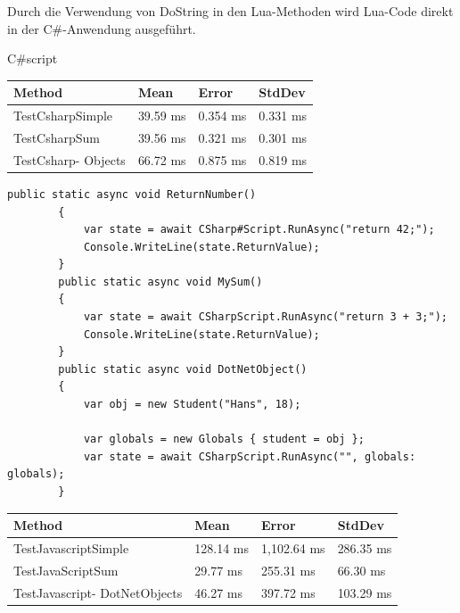 Durch die Verwendung von DoString in den Lua-Methoden wird Lua-Code direkt in der C\#-Anwendung ausgeführt.

\newpage
C\#script
        \begin{table}[H]
            \begin{tabular}{|p{3.5cm}|p{3cm}|p{3cm}|p{3cm}|}
            \hline
                Method & Mean & Error & StdDev \\ \hline
                TestCsharpSimple & 39.59 ms & 0.354 ms & 0.331 ms \\ \hline
                TestCsharpSum & 39.56 ms & 0.321 ms & 0.301 ms \\ \hline
                TestCsharp-
                Objects & 66.72 ms & 0.875 ms & 0.819 ms \\ \hline
            \end{tabular}
        \end{table}

        \begin{lstlisting}[language={[Sharp]C}, caption=\#ScriptingTestMethods, label=lst:imp:cscm]
            public static async void ReturnNumber()
        {
            var state = await CSharp#Script.RunAsync("return 42;");
            Console.WriteLine(state.ReturnValue);
        }
        public static async void MySum()
        {
            var state = await CSharpScript.RunAsync("return 3 + 3;");
            Console.WriteLine(state.ReturnValue);
        }
        public static async void DotNetObject()
        {
            var obj = new Student("Hans", 18);

            var globals = new Globals { student = obj };
            var state = await CSharpScript.RunAsync("", globals: globals);
        }
        \end{lstlisting}
     \begin{table}[H]
            \begin{tabular}{|p{3.5cm}|p{3cm}|p{3cm}|p{3cm}|}
            \hline
                Method & Mean & Error & StdDev \\ \hline
                TestJavascriptSimple & 128.14 ms & 1,102.64 ms & 286.35 ms  \\ \hline
                TestJavaScriptSum & 29.77 ms & 255.31 ms & 66.30 ms \\ \hline
                TestJavascript-
                DotNetObjects & 46.27 ms & 397.72 ms & 103.29 ms  \\ \hline
            \end{tabular}
        \end{table}

